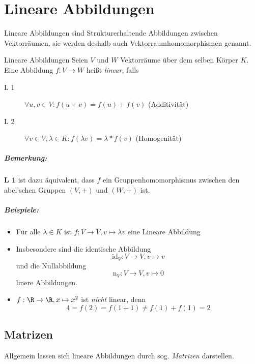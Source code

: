 \chapter{Lineare Abbildungen}
Lineare Abbildungen sind Strukturerhaltende Abbildungen zwischen Vektorräumen, sie werden deshalb auch Vektorraumhomomorphismen genannt.
\begin{definition}{Lineare Abbildungen}
	Seien $V$ und $W$ Vektorräume über dem selben Körper $K$. Eine Abbildung $f:V\rightarrow W$ heißt \emph{linear}, falls
	\begin{description}
	  \item[L 1] $\forall u,v \in V : f(u+v)= f(u)+f(v)$ (Additivität)
	  \item[L 2] $\forall v\in V, \lambda \in K : f(\lambda v) = \lambda * f(v)$ (Homogenität)
	\end{description}
\end{definition}


\paragraph{Bemerkung:}
\textbf{L 1} ist dazu äquivalent, dass $f$ ein Gruppenhomomorphismus zwischen den abel'schen Gruppen $(V,+)$ und $(W,+)$ ist.

\paragraph{Beispiele:}
\begin{itemize}
  \item Für alle $\lambda \in K$ ist $f:V\rightarrow V, v\mapsto \lambda v$ eine Lineare Abbildung
  \item Insbesondere sind die identische Abbildung
  \begin{equation*}
    \mathrm{id}_V:V\rightarrow V, v\mapsto v
  \end{equation*}
  und die Nullabbildung
  \begin{equation*}
    \mathrm{n}_V:V\rightarrow V, v\mapsto 0
  \end{equation*}
  linere Abbildungen.

  \item $f:\R\rightarrow\R, x\mapsto x^2$ ist \emph{nicht} linear, denn
  \begin{equation*}
    4=f(2)=f(1+1)\neq f(1)+f(1) = 2
  \end{equation*}
\end{itemize}

\section{Matrizen}
Allgemein lassen sich lineare Abbildungen durch sog. \emph{Matrizen} darstellen.

